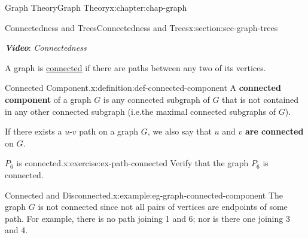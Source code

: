 \documentclass[oneside,10pt,]{book}
\newcommand{\alert}[1]{\textbf{\textit{#1}}}
\newcommand{\terminology}[1]{\textbf{#1}}
\numberwithin{equation}{section}
\begin{document}
\begin{chapterptx}{Graph Theory}{}{Graph Theory}{}{}{x:chapter:chap-graph}
\begin{sectionptx}{Connectedness and Trees}{}{Connectedness and Trees}{}{}{x:section:sec-graph-trees}
\par
\alert{Video}: \emph{Connectedness}%
\par
A graph is \hyperref[x:definition:def-connected]{connected} if there are paths between any two of its vertices.%
\begin{definition}{Connected Component.}{x:definition:def-connected-component}%
A \terminology{connected component} of a graph \(G\) is any connected subgraph of \(G\) that is not contained in any other connected subgraph (i.e.\@ the maximal connected subgraphs of \(G\)).%
\end{definition}
If there exists a \(u\)-\(v\) path on a graph \(G\), we also say that \(u\) and \(v\) \terminology{are connected} on \(G\).%
\begin{inlineexercise}{\(P_6\) is connected.}{x:exercise:ex-path-connected}%
Verify that the graph \(P_6\) is connected.%
\end{inlineexercise}%
\begin{example}{Connected and Disconnected.}{x:example:eg-graph-connected-component}%
The graph \(G\) is not connected since not all pairs of vertices are endpoints of some path. For example, there is no path joining 1 and 6; nor is there one joining 3 and 4.%
\begin{sidebyside}{1}{0.365}{0.365}{0}%
\begin{sbspanel}{0.27}%
\end{sbspanel}
\end{sidebyside}
\end{example}
\end{sectionptx}
\end{chapterptx}
\end{document}

